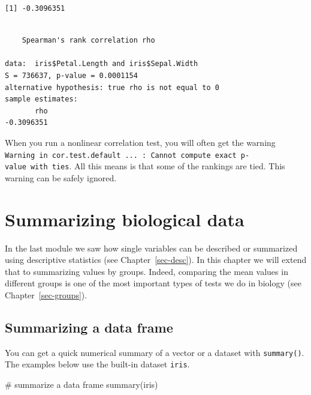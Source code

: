 \documentclass[
  13,
  letterpaper,
]{report}
\newenvironment{Shaded}{\begin{snugshade}}{\end{snugshade}}
\newcommand{\AttributeTok}[1]{\textcolor[rgb]{0.40,0.45,0.13}{#1}}
\newcommand{\CommentTok}[1]{\textcolor[rgb]{0.37,0.37,0.37}{#1}}
\newcommand{\FunctionTok}[1]{\textcolor[rgb]{0.28,0.35,0.67}{#1}}
\newcommand{\NormalTok}[1]{\textcolor[rgb]{0.00,0.23,0.31}{#1}}
\newcommand{\SpecialCharTok}[1]{\textcolor[rgb]{0.37,0.37,0.37}{#1}}
\newcommand{\StringTok}[1]{\textcolor[rgb]{0.13,0.47,0.30}{#1}}
\begin{document}
\begin{verbatim}
[1] -0.3096351
\end{verbatim}

\begin{Shaded}
\end{Shaded}

\begin{verbatim}

    Spearman's rank correlation rho

data:  iris$Petal.Length and iris$Sepal.Width
S = 736637, p-value = 0.0001154
alternative hypothesis: true rho is not equal to 0
sample estimates:
       rho 
-0.3096351 
\end{verbatim}

When you run a nonlinear correlation test, you will often get the
warning
\texttt{Warning\ in\ cor.test.default\ ...\ :\ Cannot\ compute\ exact\ p-value\ with\ ties}.
All this means is that some of the rankings are tied. This warning can
be safely ignored.

\chapter{Summarizing biological data}\label{sec-summ}

In the last module we saw how single variables can be described or
summarized using descriptive statistics (see Chapter~\ref{sec-desc}). In
this chapter we will extend that to summarizing values by groups.
Indeed, comparing the mean values in different groups is one of the most
important types of tests we do in biology (see
Chapter~\ref{sec-groups}).

\section{Summarizing a data frame}\label{summarizing-a-data-frame}

You can get a quick numerical summary of a vector or a dataset with
\texttt{summary()}. The examples below use the built-in dataset
\texttt{iris}.

\begin{Shaded}
\begin{Highlighting}[]
\CommentTok{\# summarize a data frame}
\FunctionTok{summary}\NormalTok{(iris)}
\end{Highlighting}
\end{Shaded}
\end{document}
